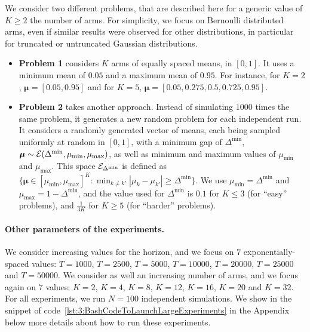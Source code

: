 We consider two different problems, that are described here for a generic value of $K \geq 2$ the number of arms.
For simplicity, we focus on Bernoulli distributed arms, even if similar results were observed for other distributions, in particular for truncated or untruncated Gaussian distributions.

\begin{itemize}
    \item \textbf{Problem 1} considers $K$ arms of equally spaced means, in $[0,1]$.
    It uses a minimum mean of $0.05$ and a maximum mean of $0.95$.
    For instance, for $K=2$, $\bm{\mu}=[0.05, 0.95]$ and for $K=5$, $\bm{\mu} = [0.05, 0.275, 0.5, 0.725, 0.95]$.

    \item \textbf{Problem 2} takes another approach. Instead of simulating $1000$ times the same problem, it generates a new random problem for each independent run.
    It considers a randomly generated vector of means, each being sampled uniformly at random in $[0,1]$, with a minimum gap of $\Delta^{\min}$, $\bm{\mu} \sim \mathcal{E}(\Delta^{\min},\mu_{\min},\mu_{\max})$, as well as minimum and maximum values of $\mu_{\min}$ and $\mu_{\max}$.
    This space $\mathcal{E}_{\Delta^{\min}}$ is defined as $\{ \bm{\mu} \in [\mu_{\min}, \mu_{\max}]^K : \min_{k\neq k'} |\mu_k - \mu_{k'}| \geq \Delta^{\min} \}$.
    We use $\mu_{\min} = \Delta^{\min}$ and $\mu_{\max} = 1 - \Delta^{\min}$,
    and the value used for $\Delta^{\min}$ is $0.1$ for $K \leq 3$ (for ``easy'' problems), and $\frac{1}{3 K}$ for $K \geq 5$ (for ``harder'' problems).
\end{itemize}


\paragraph{Other parameters of the experiments.}

We consider increasing values for the horizon, and we focus on $7$ exponentially-spaced values: $T=1000$, $T=2500$, $T=5000$, $T=10000$, $T=20000$, $T=25000$ and $T=50000$.
We consider as well an increasing number of arms, and we focus again on $7$ values: $K=2$, $K=4$, $K=8$, $K=12$, $K=16$, $K=20$ and $K=32$.
For all experiments, we run $N=100$ independent simulations.
We show in the snippet of code~\ref{lst:3:BashCodeToLaunchLargeExperiments} in the Appendix below more details about how to run these experiments.



